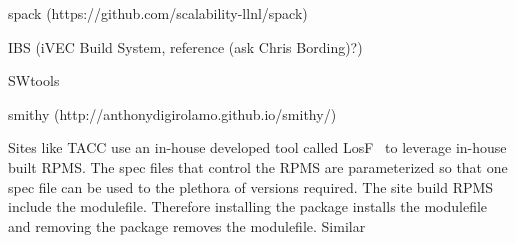 spack (https://github.com/scalability-llnl/spack)

IBS (iVEC Build System, reference (ask Chris Bording)?)

SWtools~\cite{swtools, jones08}

smithy (http://anthonydigirolamo.github.io/smithy/)

Sites like TACC use an in-house developed tool called
LosF~\cite{lmodSC11} to leverage in-house  built RPMS.  The spec files
that control the RPMS are parameterized so that one spec file can be
used to the plethora of versions required.  The site build RPMS
include the modulefile.  Therefore installing the package installs the
modulefile and removing the package removes the modulefile.
Similar~\cite{Fischer14}
